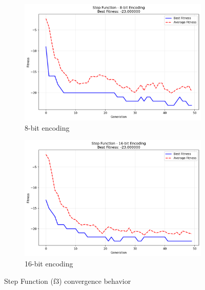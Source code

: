 \documentclass[journal,12pt,onecolumn]{IEEEtran}
\begin{document}
\begin{figure}[H]
\centering
\begin{subfigure}{0.48\textwidth}
    \includegraphics[width=\textwidth]{f3_8bit_fitness.png}
    \caption{8-bit encoding}
\end{subfigure}
\begin{subfigure}{0.48\textwidth}
    \includegraphics[width=\textwidth]{f3_16bit_fitness.png}
    \caption{16-bit encoding}
\end{subfigure}
\caption{Step Function (f3) convergence behavior}
\label{fig:f3}
\end{figure}
\end{document}
